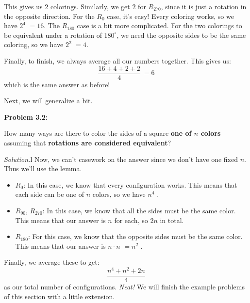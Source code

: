\documentclass[11pt]{scrartcl}
\begin{document}
This gives us \boldmath $2$ colorings. Similarly, we get $2$ for \unboldmath $R_{270}$, since it is just a rotation in the opposite direction. For the $R_{0}$ case, it's easy! Every coloring works, so we have $2^4$ \boldmath $= 16$\unboldmath. The $R_{180}$ case is a bit more complicated. For the two colorings to be equivalent under a rotation of $180^\circ$, we need the opposite sides to be the same coloring, so we have $2^2$ \boldmath $= 4$\unboldmath.

Finally, to finish, we always average all our numbers together. This gives us: \[\dfrac{16+4+2+2}{4}\ = \boxed{6}\] which is the same answer as before!

Next, we will generalize a bit.

\begin{tcolorbox}[colback=red!5!white,colframe=red!75!black]
  \color{red} \textbf{Problem 3.2:} \color{black}
  \vspace{0.1cm}
  
  How many ways are there to color the sides of a square \textbf{one of $n$ colors} assuming that \color{blue} \textbf{rotations are considered equivalent}\color{black}?
\end{tcolorbox}

\color{orange} \textit{Solution.}\color{black}\color{white}l\color{black} Now, we can't casework on the answer since we don't have one fixed $n$. Thus we'll use the lemma.
\begin{itemize}
    \item $R_0$: In this case, we know that every configuration works. This means that each side can be one of $n$ colors, so we have \boldmath $n^4$ \unboldmath.
    \item $R_{90}$, $R_{270}$: In this case, we know that all the sides must be the same color. This means that our answer is $n$ for each, so \boldmath $2n$ \unboldmath in total.
    \item $R_{180}$: For this case, we know that the opposite sides must be the same color. This means that our answer is $n \cdot n$ \boldmath $= n^2$ \unboldmath.
\end{itemize}

Finally, we average these to get: \[\dfrac{n^4+n^2+2n}{4}\] as our total number of configurations. \textit{Neat!}
We will finish the example problems of this section with a little extension. 
\end{document}
